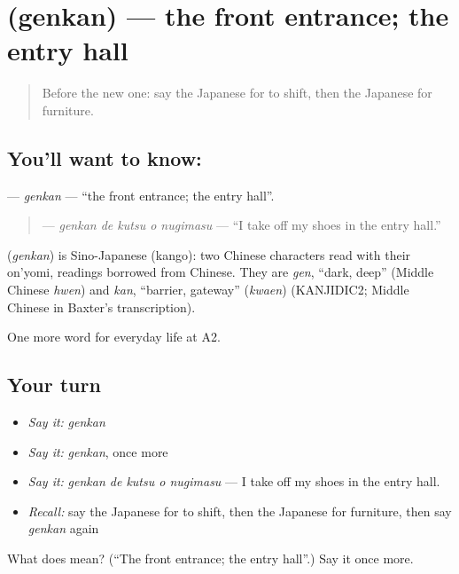 \section[\texorpdfstring{\ja{げんかん} (genkan)}{げんかん (genkan)}]{ (genkan) — the front entrance; the entry hall}

\label{lesson:JA-C155-genkan}



\begin{quote}
Before the new one: say the Japanese for to shift, then the Japanese for furniture.
\end{quote}

\subsection*{You'll want to know: }
\textbf{} — \emph{genkan} — \textquotedblleft{}the front entrance; the entry hall\textquotedblright{}.

\begin{quote}
\textbf{  } — \emph{genkan de kutsu o nugimasu} — \textquotedblleft{}I take off my shoes in the entry hall.\textquotedblright{}
\end{quote}

\begin{cousinweb}
\textbf{} (\emph{genkan}) is Sino-Japanese (kango): two Chinese characters read with their on'yomi, readings borrowed from Chinese. They are \emph{gen}, \textquotedblleft{}dark, deep\textquotedblright{} (Middle Chinese \emph{hwen}) and \emph{kan}, \textquotedblleft{}barrier, gateway\textquotedblright{} (\emph{kwaen}) (KANJIDIC2; Middle Chinese in Baxter's transcription).
\end{cousinweb}

\begin{grammarlens}[title={What you've built}]
One more word for everyday life at A2.
\end{grammarlens}

\subsection*{Your turn}
\begin{itemize}
\raggedright
  \item \emph{Say it:} \emph{genkan}
  \item \emph{Say it:} \emph{genkan}, once more
  \item \emph{Say it:} \emph{genkan de kutsu o nugimasu} — I take off my shoes in the entry hall.
  \item \emph{Recall:} say the Japanese for to shift, then the Japanese for furniture, then say \emph{genkan} again
\end{itemize}

\begin{tcolorbox}[breakable,colback=teal!4,colframe=teal!35!black,title={Before you move on}]
What does  mean? (\textquotedblleft{}The front entrance; the entry hall\textquotedblright{}.) Say it once more.
\end{tcolorbox}
